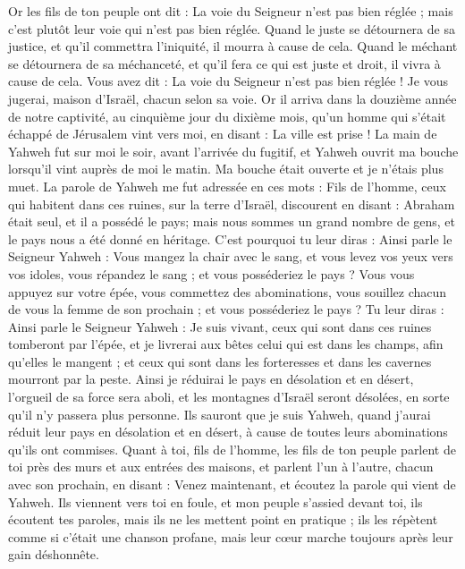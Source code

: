 \begin{multicols}{2}
Or les fils de ton peuple ont dit : La voie du Seigneur n'est pas bien réglée ; mais c'est plutôt leur voie qui n'est pas bien réglée.
Quand le juste se détournera de sa justice, et qu'il commettra l'iniquité, il mourra à cause de cela.
Quand le méchant se détournera de sa méchanceté, et qu'il fera ce qui est juste et droit, il vivra à cause de cela.
Vous avez dit : La voie du Seigneur n'est pas bien réglée ! Je vous jugerai, maison d'Israël, chacun selon sa voie.
Or il arriva dans la douzième année de notre captivité, au cinquième jour du dixième mois, qu’un homme qui s’était échappé de Jérusalem vint vers moi, en disant : La ville est prise !
La main de Yahweh fut sur moi le soir, avant l’arrivée du fugitif, et Yahweh ouvrit ma bouche lorsqu’il vint auprès de moi le matin. Ma bouche était ouverte et je n’étais plus muet.
La parole de Yahweh me fut adressée en ces mots :
Fils de l’homme, ceux qui habitent dans ces ruines, sur la terre d'Israël, discourent en disant : Abraham était seul, et il a possédé le pays; mais nous sommes un grand nombre de gens, et le pays nous a été donné en héritage.
C'est pourquoi tu leur diras : Ainsi parle le Seigneur Yahweh : Vous mangez la chair avec le sang, et vous levez vos yeux vers vos idoles, vous répandez le sang ; et vous posséderiez le pays ?
Vous vous appuyez sur votre épée, vous commettez des abominations, vous souillez chacun de vous la femme de son prochain ; et vous posséderiez le pays ?
Tu leur diras : Ainsi parle le Seigneur Yahweh : Je suis vivant, ceux qui sont dans ces ruines tomberont par l'épée, et je livrerai aux bêtes celui qui est dans les champs, afin qu'elles le mangent ; et ceux qui sont dans les forteresses et dans les cavernes mourront par la peste.
Ainsi je réduirai le pays en désolation et en désert, l'orgueil de sa force sera aboli, et les montagnes d'Israël seront désolées, en sorte qu'il n'y passera plus personne.
Ils sauront que je suis Yahweh, quand j'aurai réduit leur pays en désolation et en désert, à cause de toutes leurs abominations qu'ils ont commises.
Quant à toi, fils de l’homme, les fils de ton peuple parlent de toi près des murs et aux entrées des maisons, et parlent l'un à l'autre, chacun avec son prochain, en disant : Venez maintenant, et écoutez la parole qui vient de Yahweh.
Ils viennent vers toi en foule, et mon peuple s'assied devant toi, ils écoutent tes paroles, mais ils ne les mettent point en pratique ; ils les répètent comme si c'était une chanson profane, mais leur cœur marche toujours après leur gain déshonnête.

\end{multicols}

